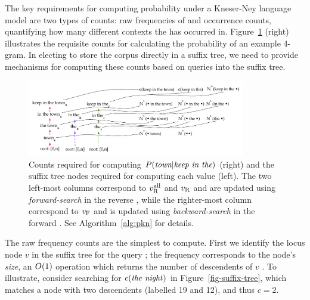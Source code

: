 
The key requirements for computing probability under a Kneser-Ney language model are two types of counts: raw frequencies of \ngrams and occurrence counts, quantifying how many different contexts the \ngram has occurred in.
Figure~\ref{fig-counts-example} (right) illustrates the requisite
counts for calculating the probability of an example 4-gram.
In electing to store the corpus directly in a suffix tree, we need to provide mechanisms for computing these counts based on queries into the suffix tree.

\begin{figure}[tpb]
\centering
\includegraphics[width=0.85\textwidth]{figures/kn_dual_cst}
\vspace{-3ex}
\caption{Counts required for computing $P(\text{\em town} | \text{\em keep in the})$ (right) and the suffix tree nodes required for computing each value (left). The two left-most columns correspond to $v_{\text{R}}^{\text{all}}$ and $v_{\text{R}}$ and are updated using \emph{forward-search} in the reverse \CST, while the righter-most column correspond to $v_{\text{F}}$ and is updated using \emph{backward-search} in the forward \CST. See Algorithm~\ref{alg:pkn} for details.}
\label{fig-counts-example}
\end{figure}


The raw frequency counts are the simplest to compute. First we
identify the locus node $v$ in the suffix tree for the query
\ngram; the frequency corresponds to the node's \emph{size}, an $O(1)$ 
operation which returns the number of descendents of $v$ . To illustrate, consider
searching for $c(\text{\emph{the night}})$ in  Figure~\ref{fig-suffix-tree}, which
matches a node with two descendents (labelled 19 and 12), and thus $c=2$. 

